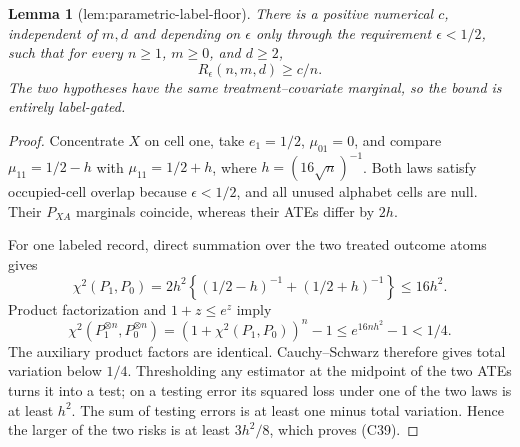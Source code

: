 \documentclass{article}
\newtheorem{lemma}{Lemma}
\begin{document}
\begin{lemma}[lem:parametric-label-floor]\label{lem:parametric-label-floor}
There is a positive numerical \(c\), independent of \(m,d\) and depending on \(\epsilon\) only through the requirement \(\epsilon<1/2\), such that for every \(n\ge1\), \(m\ge0\), and \(d\ge2\),
\[
 R_\epsilon(n,m,d)\ge c/n.                                        \tag{C39}
\]
The two hypotheses have the same treatment--covariate marginal, so the bound is entirely label-gated.
\end{lemma}
\begin{proof}
Concentrate \(X\) on cell one, take \(e_1=1/2\), \(\mu_{01}=0\), and compare \(\mu_{11}=1/2-h\) with \(\mu_{11}=1/2+h\), where \(h=(16\sqrt n)^{-1}\).  Both laws satisfy occupied-cell overlap because \(\epsilon<1/2\), and all unused alphabet cells are null.  Their \(P_{XA}\) marginals coincide, whereas their ATEs differ by \(2h\).

For one labeled record, direct summation over the two treated outcome atoms gives
\[
 \chi^2(P_1,P_0)=2h^2\left\{(1/2-h)^{-1}+(1/2+h)^{-1}\right\}
 \le16h^2.                                                         \tag{C40}
\]
Product factorization and \(1+z\le e^z\) imply
\[
 \chi^2(P_1^{\otimes n},P_0^{\otimes n})
 =(1+\chi^2(P_1,P_0))^n-1\le e^{16nh^2}-1<1/4.                    \tag{C41}
\]
The auxiliary product factors are identical.  Cauchy--Schwarz therefore gives total variation below \(1/4\).  Thresholding any estimator at the midpoint of the two ATEs turns it into a test; on a testing error its squared loss under one of the two laws is at least \(h^2\).  The sum of testing errors is at least one minus total variation.  Hence the larger of the two risks is at least \(3h^2/8\), which proves (C39).
\end{proof}
\end{document}
